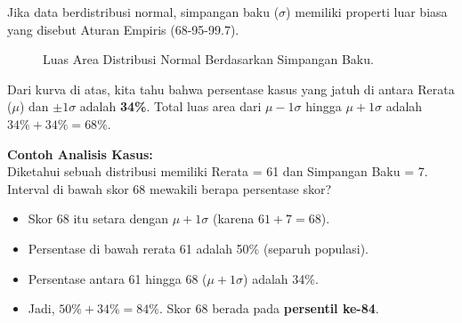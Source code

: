 \documentclass[12pt,a4paper]{article}
\begin{document}
Jika data berdistribusi normal, simpangan baku ($\sigma$) memiliki properti luar biasa yang disebut Aturan Empiris (68-95-99.7). 

\begin{figure}[h]
    \centering
    \caption{Luas Area Distribusi Normal Berdasarkan Simpangan Baku.}
\end{figure}

Dari kurva di atas, kita tahu bahwa persentase kasus yang jatuh di antara Rerata ($\mu$) dan $\pm 1\sigma$ adalah \textbf{34\%}. Total luas area dari $\mu - 1\sigma$ hingga $\mu + 1\sigma$ adalah $34\% + 34\% = 68\%$.

\textbf{Contoh Analisis Kasus:} \\
Diketahui sebuah distribusi memiliki Rerata = 61 dan Simpangan Baku = 7. Interval di bawah skor 68 mewakili berapa persentase skor?
\begin{itemize}
    \item Skor 68 itu setara dengan $\mu + 1\sigma$ (karena $61 + 7 = 68$).
    \item Persentase di bawah rerata 61 adalah 50\% (separuh populasi).
    \item Persentase antara 61 hingga 68 ($\mu + 1\sigma$) adalah 34\%.
    \item Jadi, $50\% + 34\% = 84\%$. Skor 68 berada pada \textbf{persentil ke-84}.
\end{itemize}
\end{document}
